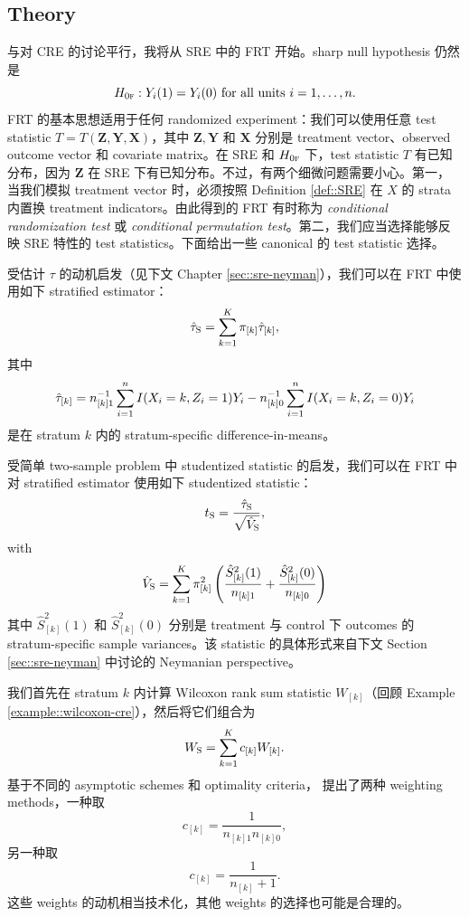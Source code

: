 \subsection{Theory}
与对 CRE 的讨论平行，我将从 SRE 中的 FRT 开始。sharp null hypothesis 仍然是
$$
H_{0\textsc{f}}: Y_i(1) = Y_i(0) \text{ for all units } i=1, \ldots, n.
$$
FRT 的基本思想适用于任何 randomized experiment：我们可以使用任意 test statistic $T = T(\boldsymbol{Z}, \boldsymbol{Y}, \boldsymbol{X})$，其中 $\boldsymbol{Z}, \boldsymbol{Y}$ 和 $\boldsymbol{X}$ 分别是 treatment vector、observed outcome vector 和 covariate matrix。在 SRE 和 $H_{0\textsc{f}}$ 下，test statistic $T$ 有已知分布，因为 $\boldsymbol{Z}$ 在 SRE 下有已知分布。不过，有两个细微问题需要小心。第一，当我们模拟 treatment vector 时，必须按照 Definition \ref{def::SRE} 在 $X$ 的 strata 内置换 treatment indicators。由此得到的 FRT 有时称为 {\it conditional randomization test} 或 {\it  conditional permutation test}。第二，我们应当选择能够反映 SRE 特性的 test statistics。下面给出一些 canonical 的 test statistic 选择。

\begin{example}
\label{eg::stratifiedestimator}
受估计 $\tau$ 的动机启发（见下文 Chapter \ref{sec::sre-neyman}），我们可以在 FRT 中使用如下 stratified estimator：
$$
\hat{\tau}_\textsc{S} = \sum_{k=1}^K  \pi_{[k]} \hat{\tau}_{[k]},
$$
其中
$$
\hat{\tau}_{[k]} = n_{[k]1}^{-1} \sum_{i=1}^n I(X_i  =k, Z_i=1) Y_i - n_{[k]0}^{-1} \sum_{i=1}^n I(X_i  =k, Z_i=0) Y_i 
$$
是在 stratum $k$ 内的 stratum-specific difference-in-means。
\end{example}




\begin{example}
\label{eg::student-stratifiedestimator}
受简单 two-sample problem 中 studentized statistic 的启发，我们可以在 FRT 中对 stratified estimator 使用如下 studentized statistic：
$$
t_\textsc{S} = 
\frac{ \hat{\tau}_\textsc{S}  }{  \sqrt{\hat{V}_\textsc{S}  }},
$$
with 
$$
\hat{V}_\textsc{S} = \sum_{k=1}^K  \pi_{[k]}^2 \left(  \frac{\hat{S}_{[k]}^2(1)}{ n_{[k]1} } +  \frac{ \hat{S}_{[k]}^2(0)}{ n_{[k]0} } \right)
$$
其中 $\hat{S}_{[k]}^2(1)$ 和 $\hat{S}_{[k]}^2(0)$ 分别是 treatment 与 control 下 outcomes 的 stratum-specific sample variances。该 statistic 的具体形式来自下文 Section \ref{sec::sre-neyman} 中讨论的 Neymanian perspective。
\end{example}




\begin{example}
\label{eg::vanelteren}
我们首先在 stratum $k$ 内计算 Wilcoxon rank sum statistic $W_{[k]}$（回顾 Example \ref{example::wilcoxon-cre}），然后将它们组合为
$$
W_\textsc{S} = \sum_{k=1}^K   c_{[k]}  W_{[k]}   . 
$$
基于不同的 asymptotic schemes 和 optimality criteria，\citet{van1960combination} 提出了两种 weighting methods，一种取
$$
c_{[k]}  = \frac{1}{  n_{[k]1}  n_{[k]0} },
$$
另一种取
$$ 
c_{[k]}  = \frac{1}{  n_{[k]}  +1 } .
$$
这些 weights 的动机相当技术化，其他 weights 的选择也可能是合理的。
\end{example}


